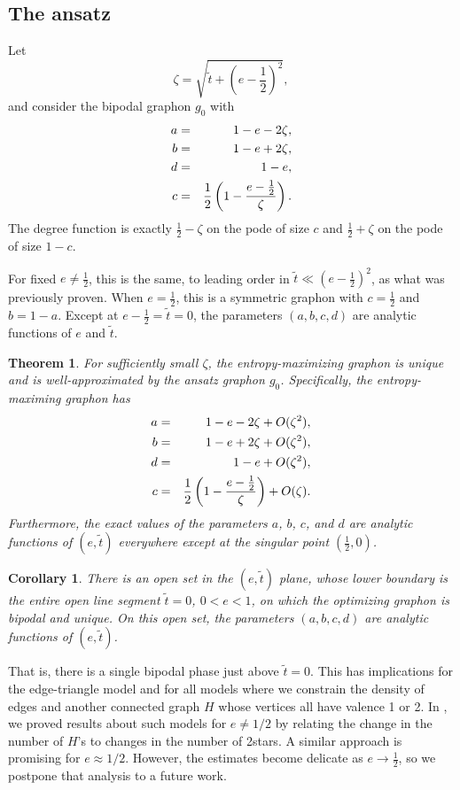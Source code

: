 \documentclass[12pt]{amsart}
\newcommand{\1}{\mathbf{1}}
\newtheorem{theorem}[lemma]{Theorem}
\newtheorem{corollary}[lemma]{Corollary}
\begin{document}
\subsection{The ansatz} 

Let 
\begin{equation} 
\zeta = \sqrt{\tilde t + (e - \frac12)^2}, 
\end{equation}
and consider the bipodal graphon $g_0$ with 
\begin{eqnarray}\label{eq:ansatz}
a & = & 1 - e - 2\zeta, \cr 
b & = & 1-e + 2 \zeta, \cr
d & = & 1-e, \cr 
c & = & \frac12 \left (1 - \frac{e-\frac12}{\zeta} \right ). 
\end{eqnarray}
The degree function is exactly $\frac 12 - \zeta$ on the pode of size $c$ and $\frac12 + \zeta$ on the pode of size $1-c$.  

For fixed $e \ne \frac12$, this is the same, to leading order in $\tilde t \ll (e-\frac12)^2$, as what was
previously proven. When $e = \frac12$, this is a symmetric graphon with 
$c=\frac12$ and $b=1-a$. 
Except at $e-\frac12 = \tilde t=0$, the parameters $(a,b,c,d)$ are analytic functions
of $e$ and $\tilde t$. 

\begin{theorem}\label{thm:low-t} For sufficiently small $\zeta$, the entropy-maximizing graphon is 
unique and is well-approximated by the ansatz graphon $g_0$. Specifically, the 
entropy-maximing graphon has 
\begin{eqnarray}\label{what-is-g}
a & = & 1 - e - 2\zeta + O(\zeta^2), \cr 
b & = & 1-e + 2 \zeta + O(\zeta^2), \cr
d & = & 1-e + O(\zeta^2), \cr 
c & = & \frac12 \left (1 - \frac{e-\frac12}{\zeta} \right ) + O(\zeta).
\end{eqnarray}
Furthermore, the exact values of the parameters $a$, $b$, $c$, and $d$ 
are analytic functions of $(e,\tilde t)$ everywhere except at the singular point 
$(\frac12, 0)$. 
\end{theorem}


\begin{corollary} There is an open set in the $(e, \tilde t)$ plane, whose lower boundary
is the entire open line segment $\tilde t=0$, $0<e<1$, on which the optimizing graphon is
bipodal and unique. On this open set, 
the parameters $(a,b,c,d)$ are analytic functions of $(e,\tilde t)$.
\end{corollary}

That is, there is a single bipodal phase just above $\tilde t=0$. This has implications
for the edge-triangle model and for all models where we constrain the density of 
edges and another connected graph $H$
whose vertices all have valence 1 or 2. In \cite{KRRS2}, we
proved results about such models for $e \ne 1/2$ 
by relating the change in the number of $H$'s to
changes in the number of 2stars. A similar approach is promising for 
$e \approx 1/2$. However, the estimates become delicate as $e \to \frac12$, so 
we postpone that analysis to a future work. 
\end{document}
